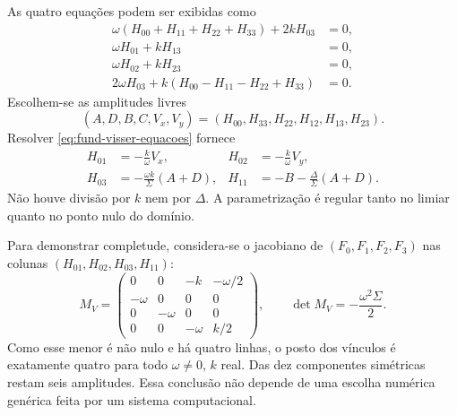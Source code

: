 As quatro equações podem ser exibidas como
\begin{equation}
 \begin{aligned}
 \omega(H_{00}+H_{11}+H_{22}+H_{33})+2kH_{03}&=0,\\
 \omega H_{01}+kH_{13}&=0,\\
 \omega H_{02}+kH_{23}&=0,\\
 2\omega H_{03}+k(H_{00}-H_{11}-H_{22}+H_{33})&=0.
 \end{aligned}
 \label{eq:fund-visser-equacoes}
\end{equation}
Escolhem-se as amplitudes livres
\begin{equation}
 (A,D,B,C,V_x,V_y)
 =(H_{00},H_{33},H_{22},H_{12},H_{13},H_{23}).
 \label{eq:fund-amplitudes-livres}
\end{equation}
Resolver \eqref{eq:fund-visser-equacoes} fornece
\begin{equation}
 \begin{aligned}
 H_{01}&=-\frac{k}{\omega}V_x,
 &H_{02}&=-\frac{k}{\omega}V_y,\\
 H_{03}&=-\frac{\omega k}{\Sigma}(A+D),
 &H_{11}&=-B-\frac{\Delta}{\Sigma}(A+D).
 \end{aligned}
 \label{eq:fund-visser-solucao}
\end{equation}
Não houve divisão por \(k\) nem por \(\Delta\). A parametrização
é regular tanto no limiar quanto no ponto nulo do domínio.

Para demonstrar completude, considera-se o jacobiano de
\((F_0,F_1,F_2,F_3)\) nas colunas
\((H_{01},H_{02},H_{03},H_{11})\):
\begin{equation}
 M_V=\begin{pmatrix}
 0&0&-k&-\omega/2\\
 -\omega&0&0&0\\
 0&-\omega&0&0\\
 0&0&-\omega&k/2
 \end{pmatrix},
 \qquad \det M_V=-\frac{\omega^2\Sigma}{2}.
 \label{eq:fund-menor-visser}
\end{equation}
Como esse menor é não nulo e há quatro linhas, o posto dos vínculos é
exatamente quatro para todo \(\omega\ne0\), \(k\) real. Das dez
componentes simétricas restam seis amplitudes. Essa conclusão não
depende de uma escolha numérica genérica feita por um sistema
computacional.

